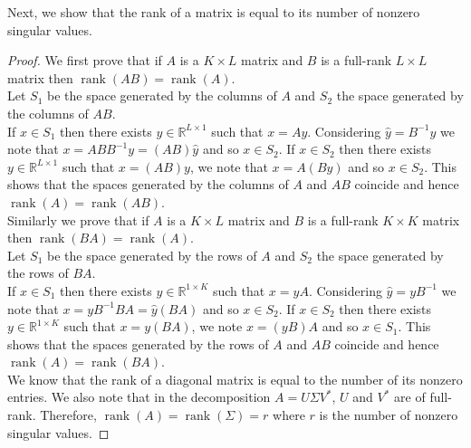 \documentclass[11pt]{article}
\DeclareMathOperator{\rank}{rank}
\newcommand{\real}{\mathbb{R}} %
\begin{document}
Next, we show that the rank of a matrix is equal to its number of nonzero singular values.
\begin{proof}
    We first prove that if $A$ is a $K\times L$ matrix and $B$ is a full-rank $L\times L$ matrix then $\rank(AB)=\rank(A)$.\\
    Let $S_1$ be the space generated by the columns of $A$ and $S_2$ the space generated by the columns of $AB$.\\
    If $x\in S_1$ then there exists $y\in \real^{L\times 1}$ such that $x=Ay$. Considering $\hat{y}=B^{-1}y$ we note that $x=ABB^{-1}y=(AB)\hat{y}$ and so $x\in S_2$. If $x\in S_2$ then there exists $y\in \real^{L\times 1}$ such that $x=(AB)y$, we note that $x=A(By)$ and so $x\in S_2$. This shows that the spaces generated by the columns of $A$ and $AB$ coincide and hence $\rank(A)=\rank(AB)$.\\
    Similarly we prove that if $A$ is a $K\times L$ matrix and $B$ is a full-rank $K\times K$ matrix then $\rank(BA)=\rank(A)$.\\
    Let $S_1$ be the space generated by the rows of $A$ and $S_2$ the space generated by the rows of $BA$.\\
    If $x\in S_1$ then there exists $y\in \real^{1\times K}$ such that $x=yA$. Considering $\hat{y}=yB^{-1}$ we note that $x=yB^{-1}BA=\hat{y}(BA)$ and so $x\in S_2$. If $x\in S_2$ then there exists $y\in \real^{1\times K}$ such that $x=y(BA)$, we note $x=(yB)A$ and so $x\in S_1$. This shows that the spaces generated by the rows of $A$ and $AB$ coincide and hence $\rank(A)=\rank(BA)$.\\
	We know that the rank of a diagonal matrix is equal to the number of its nonzero entries.
	We also note that in the decomposition \(A = U \Sigma V^*\), \(U\) and \(V^*\) are of full-rank.
	Therefore, \(\rank(A) = \rank(\Sigma) = r\) where $r$ is the number of nonzero singular values.
\end{proof}
\end{document}
